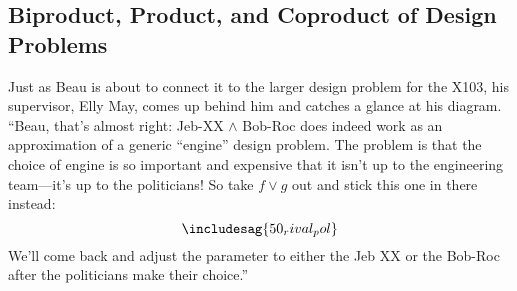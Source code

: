 \subsection{Biproduct, Product, and Coproduct of Design Problems}
\begin{example}
Just as Beau is about to connect it to the larger design problem for the X103, his supervisor, Elly May, comes up behind him and catches a glance at his diagram. ``Beau, that's almost right: Jeb-XX $\wedge$ Bob-Roc does indeed work as an approximation of a generic ``engine'' design problem. The problem is that the choice of engine is so important and expensive that it isn't up to the engineering team---it's up to the politicians! So take $f \vee g$ out and stick this one in there instead: 
\[
\includesag{50_rival_pol}
\]
We'll come back and adjust the parameter to either the Jeb XX or the Bob-Roc after the politicians make their choice.''

\end{example}
